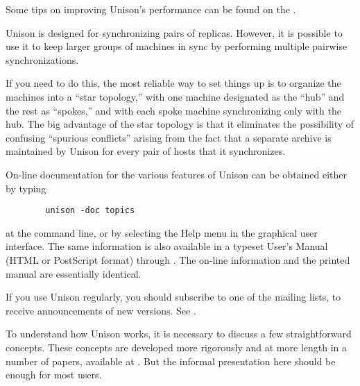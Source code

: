 \documentclass{article}
\begin{document}
Some tips on improving Unison's performance can be found on the
.


Unison is designed for synchronizing pairs of replicas.  However, it is
possible to use it to keep larger groups of machines in sync by performing
multiple pairwise synchronizations.

If you need to do this, the most reliable way to set things up is to
organize the machines into a ``star topology,'' with one machine designated
as the ``hub'' and the rest as ``spokes,'' and with each spoke machine
synchronizing only with the hub.  The big advantage of the star topology is
that it eliminates the possibility of confusing ``spurious conflicts''
arising from the fact that a separate archive is maintained by Unison for
every pair of hosts that it synchronizes.



On-line documentation for the various features of Unison
can be obtained either by typing
\begin{verbatim}
        unison -doc topics
\end{verbatim}
\noindent
at the command line, or by selecting the Help menu in the graphical
user interface.
\iftextversion
The same information is also available in a typeset User's
Manual (HTML or PostScript format) through
.
\else
The on-line information and the printed manual are essentially identical.
\fi

If you use Unison regularly, you should subscribe to one of the mailing
lists, to receive announcements of new versions.  See
.


To understand how Unison works, it is necessary to discuss a few
straightforward concepts.
%
These concepts are developed more rigorously and at more length in a number
of papers, available at .
But the informal presentation here should be enough for most users.


\end{document}
